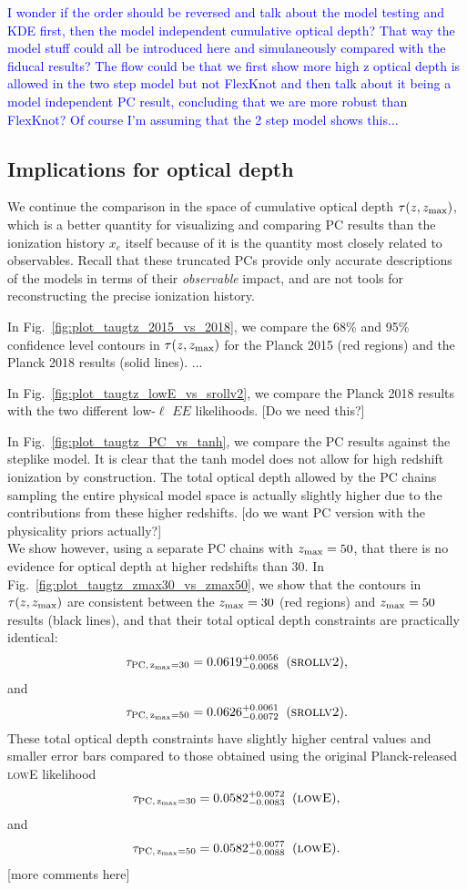 \documentclass[prd,twocolumn,amsmath,amssymb,floatfix,superscriptaddress,nofootinbib]{revtex4-1}
\newcommand{\zmax}{z_{\rm max}}
\newcommand{\beq}{\begin{equation}}
\newcommand{\eeq}{\end{equation}}
\newcommand{\wh}[1]{\textcolor{blue}{#1}}
\begin{document}
\wh{I wonder if the order should be reversed and talk about the model testing and KDE first, then the model independent cumulative optical depth?  That way the model stuff could all be introduced here and simulaneously compared with the fiducal results?  The flow could be that we first show more high z optical depth is allowed in the two step model but not FlexKnot and then talk about it being a model independent PC result, concluding that we are more robust than FlexKnot?  Of course I'm assuming that the 2 step model shows this...}

\subsection{Implications for optical depth}

We continue the comparison in the space of cumulative optical depth $\tau(z, \zmax)$, which is a better quantity for visualizing and comparing PC results than the ionization history $x_e$ itself because of it is the quantity most closely related to observables. Recall that these truncated PCs provide only accurate descriptions of the models in terms of their \textit{observable} impact, and are not tools for reconstructing the precise ionization history.

In Fig.~\ref{fig:plot_taugtz_2015_vs_2018}, we compare the 68\% and 95\% confidence level contours in $\tau(z, \zmax)$ for the Planck 2015 (red regions) and the Planck 2018 results (solid lines).
...

In Fig.~\ref{fig:plot_taugtz_lowE_vs_srollv2}, we compare the Planck 2018 results with the two different low-$\ell$ $EE$ likelihoods. [Do we need this?]

In Fig.~\ref{fig:plot_taugtz_PC_vs_tanh}, we compare the PC results against the steplike model. It is clear that the tanh model does not allow for high redshift ionization by construction. The total optical depth allowed by the PC chains sampling the entire physical model space is actually slightly higher due to the contributions from these higher redshifts. [do we want PC version with the physicality priors actually?]\\

We show however, using a separate PC chains with $\zmax = 50$, that there is no evidence for optical depth at higher redshifts than 30. In Fig.~\ref{fig:plot_taugtz_zmax30_vs_zmax50}, we show that the contours in $\tau(z, \zmax)$ are consistent between the $\zmax = 30$ (red regions) and $\zmax = 50$ results (black lines), and that their total optical depth constraints are practically identical: 
\beq
\tau_{\rm PC,\, \zmax=30} = 0.0619^{+0.0056}_{-0.0068}\;\; (\textsc{srollv2}),
\eeq
and
\beq
\tau_{\rm PC,\, \zmax=50} = 0.0626^{+0.0061}_{-0.0072}\;\; (\textsc{srollv2}).
\eeq
These total optical depth constraints have slightly higher central values and smaller error bars compared to those obtained using the original Planck-released \textsc{lowE} likelihood
\beq
\tau_{\rm PC,\, \zmax=30} = 0.0582 ^{+0.0072}_{-0.0083}\;\; (\textsc{lowE}),
\eeq
and
\beq
\tau_{\rm PC,\, \zmax=50} = 0.0582^{+0.0077}_{-0.0088}\;\; (\textsc{lowE}).
\eeq
[more comments here]
%
\end{document}
